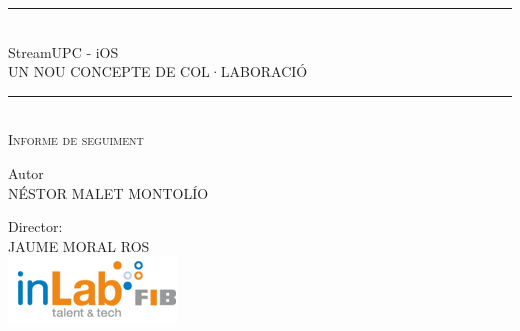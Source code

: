 \begin{titlepage}
\begin{center}
    \vspace*{\baselineskip}
    \rule{\textwidth}{0.4pt}\\[\baselineskip]
    {\LARGE StreamUPC - iOS\\[0.5\baselineskip] UN NOU CONCEPTE DE COL·LABORACIÓ}\\[0.5\baselineskip]
    \rule{\textwidth}{0.4pt}\vspace*{-\baselineskip}\vspace{3.2pt}\\[\baselineskip]
    \vspace*{\baselineskip}
    \scshape
    {\LARGE Informe de seguiment}\par
    \vspace*{2\baselineskip}
    {\large Autor}                                                      \\[\baselineskip]
    {\large NÉSTOR MALET MONTOLÍO}                                       \\[5\baselineskip]
    \begin{minipage}{0.30\textwidth}
        \begin{flushleft}
            Director:                                                   \\[0.9\baselineskip]
            JAUME MORAL ROS                                             \\[0.8\baselineskip]
            \includegraphics[scale=0.4]{NotDef/logo_inlab.png}          \\


\end{flushleft}
\end{minipage}
\end{center}
\end{titlepage}
